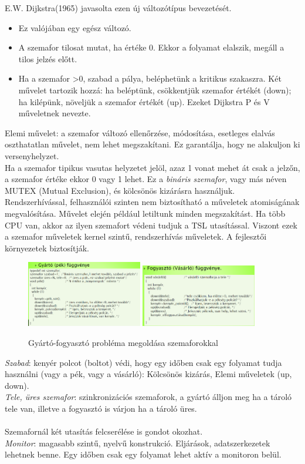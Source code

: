 \documentclass[margin=0px]{article}
\begin{document}
E.W. Dijkstra(1965) javasolta ezen új változótípus bevezetését.
\begin{itemize}
    \item Ez valójában egy egész változó.
    \item A szemafor tilosat mutat, ha értéke 0. Ekkor a folyamat elalszik, megáll a tilos jelzés előtt.
    \item Ha a szemafor >0, szabad a pálya, beléphetünk a kritikus szakaszra. Két művelet tartozik hozzá: ha beléptünk, csökkentjük szemafor értékét (down); ha kilépünk, növeljük a szemafor értékét (up). Ezeket Dijkstra P és V műveletnek nevezte.
\end{itemize}
Elemi művelet: a szemafor változó ellenőrzése, módosítása, esetleges elalvás oszthatatlan művelet, nem lehet megszakítani. Ez garantálja, hogy ne alakuljon ki versenyhelyzet. \\
Ha a szemafor tipikus vasutas helyzetet jelöl, azaz 1 vonat mehet át csak a jelzőn, a szemafor értéke ekkor 0 vagy 1 lehet. Ez a \textit{bináris szemafor}, vagy más néven MUTEX (Mutual Exclusion), és kölcsönös kizárásra használjuk. \\
Rendszerhívással, felhasználói szinten nem biztosítható a műveletek atomiságának megvalósítása. Művelet elején például letiltunk minden megszakítást. Ha több CPU van, akkor az ilyen szemafort védeni tudjuk a TSL utasítással. Viszont ezek a szemafor műveletek kernel szintű, rendszerhívás műveletek. A fejlesztői környezetek biztosítják.
\begin{figure}[H]
    \centering
    \includegraphics[width=0.45\textwidth]{img/gyarto_szemafor.png}
    \includegraphics[width=0.45\textwidth]{img/fogyaszto_szemafor.png}
    \caption{Gyártó-fogyasztó probléma megoldása szemaforokkal}
\end{figure}
\textit{Szabad}: kenyér polcot (boltot) védi, hogy egy időben csak egy folyamat tudja használni (vagy a pék, vagy a vásárló): Kölcsönös kizárás, Elemi műveletek (up, down). \\
\textit{Tele, üres szemafor}: szinkronizációs szemaforok, a gyártó álljon meg ha a tároló tele van, illetve a fogyasztó is várjon ha a tároló üres. \\ \\
Szemafornál két utasítás felcserélése is gondot okozhat. \\
\textit{Monitor}: magasabb szintű, nyelvű konstrukció. Eljárások, adatszerkezetek
lehetnek benne. Egy időben csak egy folyamat lehet aktív a monitoron belül.
\end{document}
